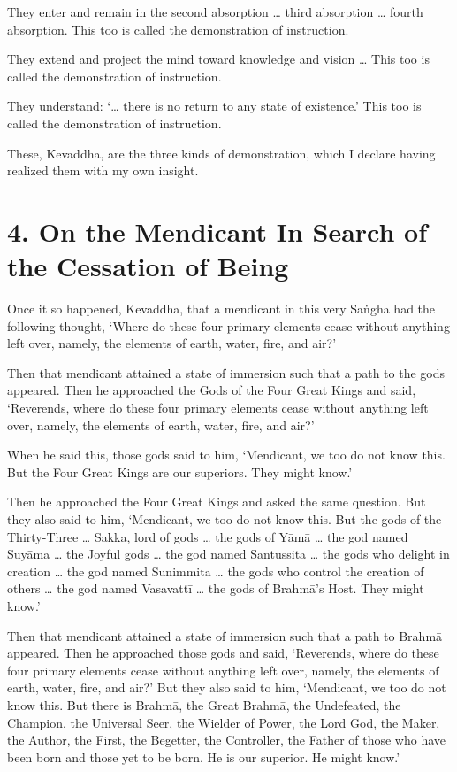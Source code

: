 \documentclass[12pt,openany]{book}%
\begin{document}
They enter and remain in the second absorption … third absorption … fourth absorption. This too is called the demonstration of instruction. 

They extend and project the mind toward knowledge and vision … This too is called the demonstration of instruction. 

They understand: ‘… there is no return to any state of existence.’ This too is called the demonstration of instruction. 

These, Kevaddha, are the three kinds of demonstration, which I declare having realized them with my own insight. 

\section*{4. On the Mendicant In Search of the Cessation of Being }

Once it so happened, Kevaddha, that a mendicant in this very \textsanskrit{Saṅgha} had the following thought, ‘Where do these four primary elements cease without anything left over, namely, the elements of earth, water, fire, and air?’ 

Then that mendicant attained a state of immersion such that a path to the gods appeared. Then he approached the Gods of the Four Great Kings and said, ‘Reverends, where do these four primary elements cease without anything left over, namely, the elements of earth, water, fire, and air?’ 

When he said this, those gods said to him, ‘Mendicant, we too do not know this. But the Four Great Kings are our superiors. They might know.’ 

Then he approached the Four Great Kings and asked the same question. But they also said to him, ‘Mendicant, we too do not know this. But the gods of the Thirty-Three … Sakka, lord of gods … the gods of \textsanskrit{Yāmā} … the god named \textsanskrit{Suyāma} … the Joyful gods … the god named Santussita … the gods who delight in creation … the god named Sunimmita … the gods who control the creation of others … the god named \textsanskrit{Vasavattī} … the gods of \textsanskrit{Brahmā}’s Host. They might know.’ 

Then that mendicant attained a state of immersion such that a path to \textsanskrit{Brahmā} appeared. Then he approached those gods and said, ‘Reverends, where do these four primary elements cease without anything left over, namely, the elements of earth, water, fire, and air?’ But they also said to him, ‘Mendicant, we too do not know this. But there is \textsanskrit{Brahmā}, the Great \textsanskrit{Brahmā}, the Undefeated, the Champion, the Universal Seer, the Wielder of Power, the Lord God, the Maker, the Author, the First, the Begetter, the Controller, the Father of those who have been born and those yet to be born. He is our superior. He might know.’ 
\end{document}
